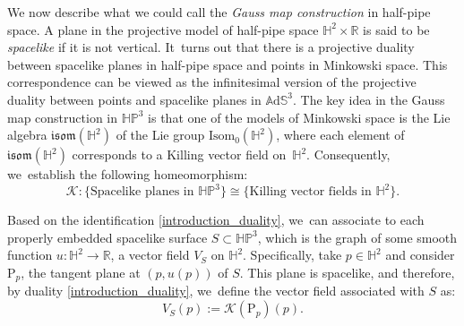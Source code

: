 \documentclass[10pt]{amsart}
\theoremstyle{plain}
\theoremstyle{definition}
\newcommand{\ads}{\mathbb{A}\mathrm{d}\mathbb{S}^3}
\newcommand{\HP}{\mathbb{HP}^3}
\begin{document}
We now describe what we could call the \emph{Gauss map construction} in half-pipe space. A plane in the projective model of half-pipe space \(\mathbb{H}^2 \times \mathbb{R}\) is said to be \emph{spacelike} if it is not vertical. It~turns out that there is a projective duality between spacelike planes in half-pipe space and points in Minkowski space. This correspondence can be viewed as the infinitesimal version of the projective duality between points and spacelike planes in \(\ads\). The key idea in the Gauss map construction in \(\HP\) is that one of the models of Minkowski space is the Lie algebra \(\mathfrak{isom}(\mathbb{H}^2)\) of the Lie group \(\text{Isom}_0(\mathbb{H}^2)\), where each element of \(\mathfrak{isom}(\mathbb{H}^2)\) corresponds to a Killing vector field on~\(\mathbb{H}^2\). Consequently, we~establish the following homeomorphism:
\begin{equation}\label{introduction_duality}
\mathcal{K}: \{\text{Spacelike planes in } \HP\} \cong \{\text{Killing vector fields in } \mathbb{H}^2\}.
\end{equation}

Based on the identification \eqref{introduction_duality}, we~can associate to each properly embedded spacelike surface \(S \subset \HP\), which is the graph of some smooth function \(u: \mathbb{H}^2 \to \mathbb{R}\), a vector field \(V_S\) on \(\mathbb{H}^2\). Specifically, take \(p \in \mathbb{H}^2\) and consider \(\mathrm{P}_p\), the tangent plane at \((p,u(p))\) of \(S\). This plane is spacelike, and therefore, by duality \eqref{introduction_duality}, we~define the vector field associated with \(S\) as:
\begin{equation}\label{2}
V_S(p):=\mathcal{K}(\mathrm{P}_p)(p).
\end{equation}
\end{document}
